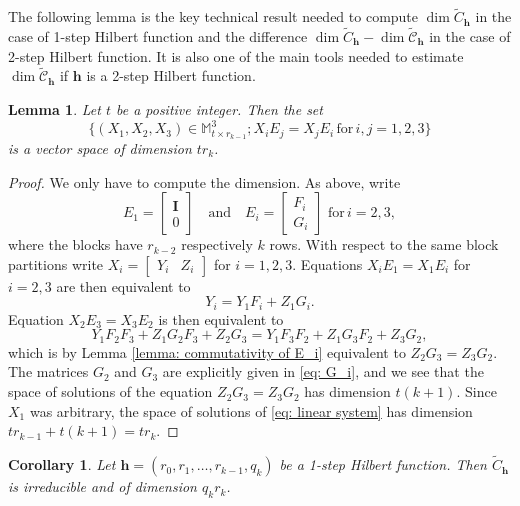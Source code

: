 \documentclass[11pt]{amsart}
\newtheorem{lemma}[thm]{Lemma}
\newtheorem{cor}[thm]{Corollary}
\theoremstyle{definition}
\newcommand{\h}{\mathbf{h}}
\newcommand{\tC}{\widetilde{C}}
\newcommand{\tcC}{\widetilde{\mathscr{C}}}
\newcommand{\II}{\mathbf{I}}
\begin{document}
The following lemma is the key technical result needed to compute $\dim \tC_ \h$ in the case of 1-step Hilbert function and the difference $\dim \tC_\h-\dim \tcC_\h$ in the case of 2-step Hilbert function. It is also one of the main tools needed to estimate $\dim \tcC_\h$ if $\h$ is a 2-step Hilbert function.

\begin{lemma}\label{lemma: commutativity 1 - vector spaces}
Let $t$ be a positive integer. Then the set
\begin{equation}\label{eq: linear system}
\{(X_1,X_2,X_3)\in \mathbb{M}_{t\times r_{k-1}}^3;X_iE_j=X_jE_i\, \mathrm{for}\, i,j=1,2,3\}
\end{equation}
is a vector space of dimension $tr_k$.
\end{lemma}

\begin{proof}
We only have to compute the dimension. As above, write
$$E_1=\begin{bmatrix} \II \\  0
\end{bmatrix}\quad \mathrm{and}\quad E_i=\begin{bmatrix}
F_i \\ G_i
\end{bmatrix}\, \, \mathrm{for}\, i=2,3,$$
where the blocks have $r_{k-2}$ respectively $k$ rows. With respect to the same block partitions write $X_i=\begin{bmatrix}Y_i & Z_i\end{bmatrix}$ for $i=1,2,3$. Equations $X_iE_1=X_1E_i$ for $i=2,3$ are then equivalent to
$$Y_i=Y_1F_i+Z_1G_i.$$
Equation $X_2E_3=X_3E_2$ is then equivalent to
$$Y_1F_2F_3+Z_1G_2F_3+Z_2G_3=Y_1F_3F_2+Z_1G_3F_2+Z_3G_2,$$
which is by Lemma \ref{lemma: commutativity of E_i} equivalent to $Z_2G_3=Z_3G_2$. The matrices $G_2$ and $G_3$ are explicitly given in \eqref{eq: G_i}, and we see that the space of solutions of the equation $Z_2G_3=Z_3G_2$ has dimension $t(k+1)$. Since $X_1$ was arbitrary, the space of solutions of \eqref{eq: linear system} has dimension $tr_{k-1}+t(k+1)=tr_k.$
\end{proof}

\begin{cor}\label{cor: dim 1-step matrices}
Let $\h=(r_0,r_1,\ldots ,r_{k-1},q_k)$ be a 1-step Hilbert function. Then $\tC_\h$ is irreducible and of dimension $q_kr_k$.
\end{cor}
\end{document}
